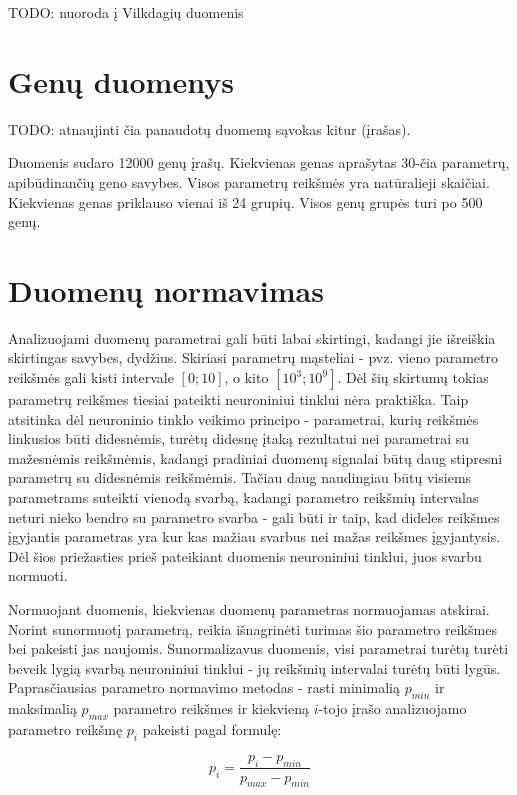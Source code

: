 \documentclass{VUMIFPSbakalaurinis}
\newcommand{\TODO}[1]{
\colorbox{todo-background-color}{TODO: #1}
}
\begin{document}
\TODO{nuoroda į Vilkdagių duomenis}

\section{Genų duomenys}

\TODO{atnaujinti čia panaudotų duomenų sąvokas kitur (įrašas).}

Duomenis sudaro 12000 genų įrašų.
Kiekvienas genas aprašytas 30-čia parametrų, apibūdinančių geno savybes.
Visos parametrų reikšmės yra natūralieji skaičiai.
Kiekvienas genas priklauso vienai iš 24 grupių.
Visos genų grupės turi po 500 genų.


\section{Duomenų normavimas}

Analizuojami duomenų parametrai gali būti labai skirtingi, kadangi jie išreiškia skirtingas savybes, dydžius.
Skiriasi parametrų mąsteliai - pvz. vieno parametro reikšmės gali kisti intervale $[0; 10]$, o kito $[10^3; 10^9]$.
Dėl šių skirtumų tokias parametrų reikšmes tiesiai pateikti neuroniniui tinklui nėra praktiška.
Taip atsitinka dėl neuroninio tinklo veikimo principo - parametrai, kurių reikšmės linkusios būti didesnėmis, turėtų didesnę įtaką rezultatui nei parametrai su mažesnėmis reikšmėmis, kadangi pradiniai duomenų signalai būtų daug stipresni parametrų su didesnėmis reikšmėmis.
Tačiau daug naudingiau būtų visiems parametrams suteikti vienodą svarbą, kadangi parametro reikšmių intervalas neturi nieko bendro su parametro svarba - gali būti ir taip, kad dideles reikšmes įgyjantis parametras yra kur kas mažiau svarbus nei mažas reikšmes įgyjantysis.
Dėl šios priežasties prieš pateikiant duomenis neuroniniui tinklui, juos svarbu normuoti.

Normuojant duomenis, kiekvienas duomenų parametras normuojamas atskirai.
Norint sunormuotį parametrą, reikia išnagrinėti turimas šio parametro reikšmes bei pakeisti jas naujomis.
Sunormalizavus duomenis, visi parametrai turėtų turėti beveik lygią svarbą neuroniniui tinklui - jų reikšmių intervalai turėtų būti lygūs.
Paprasčiausias parametro normavimo metodas - rasti minimalią $p_{min}$ ir maksimalią $p_{max}$ parametro reikšmes ir kiekvieną $i$-tojo įrašo analizuojamo parametro reikšmę $p_i$ pakeisti pagal formulę:

\begin{equation}
p_i = \frac{p_i - p_{min}}{p_{max} - p_{min}}
\end{equation}
\end{document}
